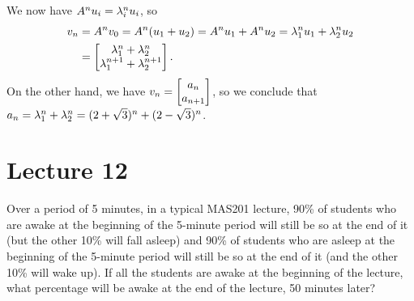 \documentclass[a4paper]{amsart}
\renewenvironment{solution}{\SolutionInline}{\endSolutionInline}
\begin{document}
\begin{solution}
 We now have $A^nu_i=\lambda_i^nu_i$, so
 \begin{align*}
  v_n &= A^nv_0 = A^n(u_1+u_2) = A^nu_1+A^nu_2 = \lambda_1^nu_1+\lambda_2^nu_2 \\
      &= \left[\begin{matrix} \lambda_1^n + \lambda_2^n \\ \lambda_1^{n+1} + \lambda_2^{n+1} \end{matrix}\right].      
 \end{align*}
 On the other hand, we have $v_n=\left[\begin{matrix} a_n\\ a_{n+1}\end{matrix}\right]$, so we
 conclude that $a_n=\lambda_1^n+\lambda_2^n=(2+\sqrt{3})^n+(2-\sqrt{3})^n$.
\end{solution}

\section{Lecture 12}

\begin{exercise}\label{ex-markov-i}
 Over a period of 5 minutes, in a typical MAS201 lecture, 90\% of
 students who are awake at the beginning of the 5-minute period will
 still be so at the end of it (but the other 10\% will fall asleep)
 and 90\% of students who are asleep at the beginning of the 5-minute
 period will still be so at the end of it (and the other 10\% will
 wake up). If all the students are awake at the beginning of the
 lecture, what percentage will be awake at the end of the lecture, 50
 minutes later?
\end{exercise}
\end{document}
